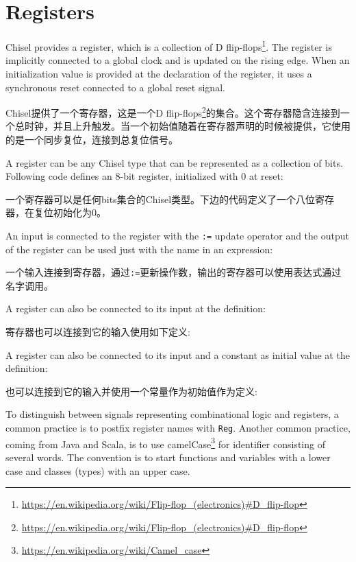 \documentclass[%
    10pt,
    headinclude, footexclude,
    openright, %
    notitlepage,
    cleardoubleempty,
    headsepline,
    pointlessnumbers,
    bibtotoc, idxtotoc,
    ]{scrbook}
\newcommand{\code}[1]{{\small{\texttt{#1}}}}
\newcommand{\myref}[2]{\href{#1}{#2}}
\renewcommand{\myref}[2]{{#2}{\footnote{\url{#1}}}}
\begin{document}
\section{Registers}

Chisel provides a register, which is a collection of
\myref{https://en.wikipedia.org/wiki/Flip-flop\_(electronics)\#D\_flip-flop}{D flip-flops}.
The register is implicitly connected to a global clock and is updated on the rising edge.
When an initialization value is provided at the declaration of the register,
it uses a synchronous reset connected to a global reset signal.

Chisel提供了一个寄存器，这是一个\myref{https://en.wikipedia.org/wiki/Flip-flop\_(electronics)\#D\_flip-flop}{D flip-flops}的集合。这个寄存器隐含连接到一个总时钟，并且上升触发。当一个初始值随着在寄存器声明的时候被提供，它使用的是一个同步复位，连接到总复位信号。

A register can be any Chisel type that can be represented as a collection of bits.
Following code defines an 8-bit register, initialized with 0 at reset:

一个寄存器可以是任何bits集合的Chisel类型。下边的代码定义了一个八位寄存器，在复位初始化为0。



\noindent An input is connected to the register with the \code{:=} update operator and
the output of the register can be used just with the name in an expression:

一个输入连接到寄存器，通过\code{:=}更新操作数，输出的寄存器可以使用表达式通过名字调用。


\noindent A register can also be connected to its input at the definition:

寄存器也可以连接到它的输入使用如下定义: 


\noindent A register can also be connected to its input and a constant as
initial value at the definition:

也可以连接到它的输入并使用一个常量作为初始值作为定义:


\noindent To distinguish between signals representing combinational logic and registers,
a common practice is to postfix register names with \code{Reg}.
Another common practice, coming from Java and Scala, is to use
\myref{https://en.wikipedia.org/wiki/Camel_case}{camelCase} for
identifier consisting of several words. The convention is to start
functions and variables with a lower case and classes (types) with
an upper case.
\end{document}
